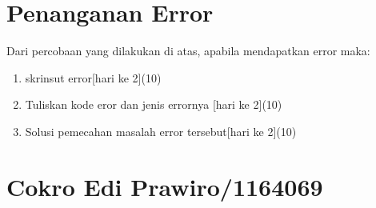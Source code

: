 \section{Penanganan Error}
Dari percobaan yang dilakukan di atas, apabila mendapatkan error maka:

\begin{enumerate}
	\item
	skrinsut error[hari ke 2](10)
	\item
Tuliskan kode eror dan jenis errornya [hari ke 2](10)
	\item
Solusi pemecahan masalah error tersebut[hari ke 2](10)

\end{enumerate}

\section{Cokro Edi Prawiro/1164069}
